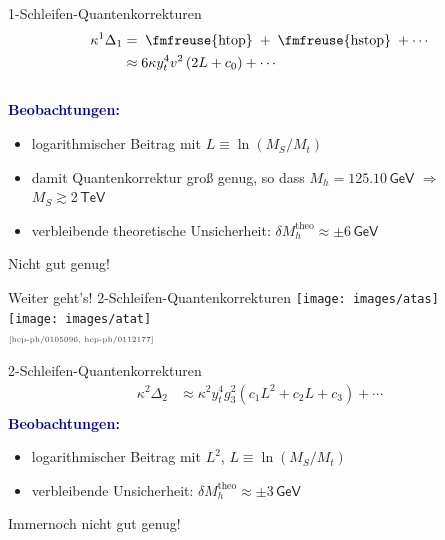 \documentclass[hyperref={pdfpagelabels=false},ngerman]{beamer}
\newcommand{\fmfvcenter}[1]{\;\vcenter{\hbox{\fmfreuse{#1}}}\;}
\newcommand{\eh}[1]{\,\mathsf{#1}}
\newcommand{\MS}{\ensuremath{M_S}}
\newcommand{\mycite}[1]{\ensuremath{\text{\textcolor{darkgray}{\tiny [#1]}}}}
\renewcommand{\emph}[1]{\textbf{\textcolor{darkblue}{#1}}}
\newcommand{\GeV}{\eh{GeV}}
\newcommand{\TeV}{\eh{TeV}}
\begin{document}
\begin{frame}{1-Schleifen-Quantenkorrekturen}
  \begin{align*}
    \kappa^1\Delta_1
    &= \fmfvcenter{htop} + \fmfvcenter{hstop} + \cdots \\
    &\approx
    6 \kappa y_t^4 v^2 \left(
      2L + c_0
    \right) + \cdots
  \end{align*}
  \\[1em]
  \emph{Beobachtungen:}
  \begin{itemize}
  \item logarithmischer Beitrag mit $L\equiv\ln(\MS / M_t)$
  \item damit Quantenkorrektur groß genug, so dass $M_h = 125.10\GeV$
    $\Rightarrow$ $\MS \gtrsim 2\TeV$
  \item verbleibende theoretische Unsicherheit: $\delta M_h^{\text{theo}} \approx \pm 6 \GeV$
  \end{itemize}
  \vspace*{1em}
  Nicht gut genug!
\end{frame}

\begin{frame}{Weiter geht's! 2-Schleifen-Quantenkorrekturen}
  \texttt{[image: images/atas]}\\[1em]
  \texttt{[image: images/atat]}
  \\
  \vspace*{1em}
  \mycite{hep-ph/0105096, hep-ph/0112177}
\end{frame}

\begin{frame}{2-Schleifen-Quantenkorrekturen}
  \begin{align*}
    \kappa^2\Delta_2 &\approx
    \kappa^2 y_t^4 g_3^2 \left(
      c_1 L^2
      + c_2 L
      + c_3
    \right) + \cdots \\
  \end{align*}
  \emph{Beobachtungen:}
  \begin{itemize}
  \item logarithmischer Beitrag mit $L^2$, $L\equiv\ln(\MS / M_t)$
  \item verbleibende Unsicherheit: $\delta M_h^{\text{theo}} \approx \pm 3 \GeV$
  \end{itemize}
  \vspace*{1em}
  Immernoch nicht gut genug!
\end{frame}
\end{document}
